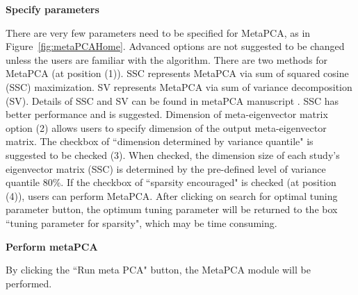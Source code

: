 \begin{steps}

\item \textbf{Specify parameters} 

There are very few parameters need to be specified for MetaPCA, as in Figure~\ref{fig:metaPCAHome}.
Advanced options are not suggested to be changed unless the users are familiar with the algorithm.
There are two methods for MetaPCA (at position {\color{red} (1)}). 
SSC represents MetaPCA via sum of squared cosine (SSC) maximization.
SV represents MetaPCA via sum of variance decomposition (SV).
Details of SSC and SV can be found in metaPCA manuscript \citep{kim2017meta}.
SSC has better performance and is suggested.
Dimension of meta-eigenvector matrix option {\color{red} (2)} allows users to specify dimension of the output meta-eigenvector matrix.
The checkbox of ``dimension determined by variance quantile" is suggested to be checked {\color{red} (3)}.
When checked, the dimension size of each study's eigenvector matrix (SSC) is determined  by the pre-defined level of variance quantile 80\%.
If the checkbox of ``sparsity encouraged" is checked (at position {\color{red} (4)}), users can perform MetaPCA.
After clicking on search for optimal tuning parameter button, the optimum tuning parameter will be returned to the box ``tuning parameter for sparsity", 
which may be time consuming.

\item \textbf{Perform metaPCA} 

By clicking the ``Run meta PCA" button, the MetaPCA module will be performed.


\end{steps}

